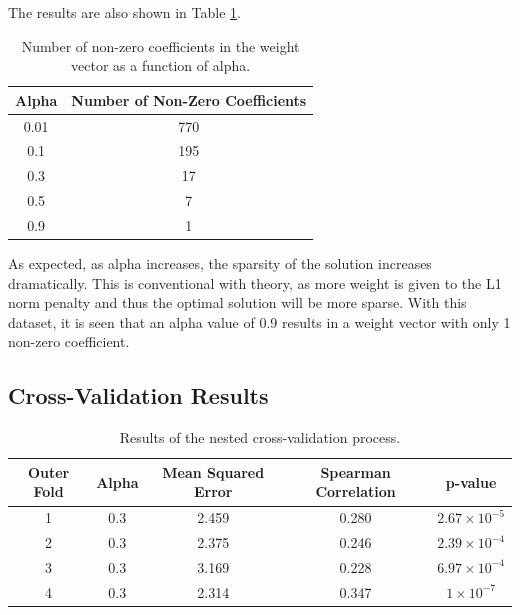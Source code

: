 \documentclass[11pt]{article}
\begin{document}
\vspace{-0.5cm}

The results are also shown in Table \ref{tab:no_normal_lasso_alpha}.

\begin{table}[H]
    \centering
    \begin{tabular}{|c|c|}
        \hline 
        \textbf{Alpha} & \textbf{Number of Non-Zero Coefficients} \\
        \hline
        0.01 & 770 \\
        0.1 & 195 \\
        0.3 & 17 \\
        0.5 & 7 \\
        0.9 & 1 \\
        \hline
    \end{tabular}
    \caption{Number of non-zero coefficients in the weight vector as a function of alpha.}
    \label{tab:no_normal_lasso_alpha}
\end{table}

As expected, as alpha increases, the sparsity of the solution increases dramatically. This is conventional with theory, as more weight is given to the L1 norm penalty and thus the optimal solution will be more sparse. With this dataset, it is seen that an alpha value of 0.9 results in a weight vector with only 1 non-zero coefficient.

\subsection*{Cross-Validation Results}
\begin{table}[H]
    \centering
    \begin{tabular}{|c|c|c|c|c|}
        \hline
        Outer Fold & Alpha & Mean Squared Error & Spearman Correlation & p-value \\
        \hline
        1 & 0.3 & 2.459 & 0.280 & $2.67 \times 10^{-5}$ \\
        2 & 0.3 & 2.375 & 0.246 & $2.39 \times 10^{-4}$ \\
        3 & 0.3 & 3.169 & 0.228 & $6.97 \times 10^{-4}$ \\
        4 & 0.3 & 2.314 & 0.347 & $1 \times 10^{-7}$ \\
        \hline
    \end{tabular}
    \caption{Results of the nested cross-validation process.}
    \label{tab:no_normal_regression_results}
\end{table}
\end{document}
